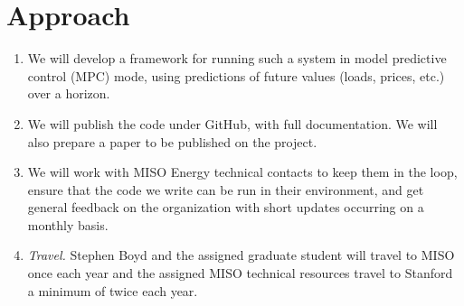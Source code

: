 \documentclass[12pt]{article}
\begin{document}
\section{Approach}

\begin{enumerate}
\item 
We will develop a framework for running such a system in model predictive control (MPC)
mode, using predictions of future values (loads, prices, etc.) over a horizon.

\item
We will publish the code under GitHub,
with full documentation. We will also prepare a paper to be published on the project.

\item 
We will work with MISO Energy technical contacts to keep them in the loop,
ensure that the code we write can be run in their environment,
and get general feedback on the organization with short updates
occurring on a monthly basis.

\item \emph{Travel.} 
Stephen Boyd and the assigned graduate student
will travel to MISO once each year and the assigned MISO technical 
resources travel to Stanford a minimum of twice each year.

%
\end{enumerate}


\end{document}
